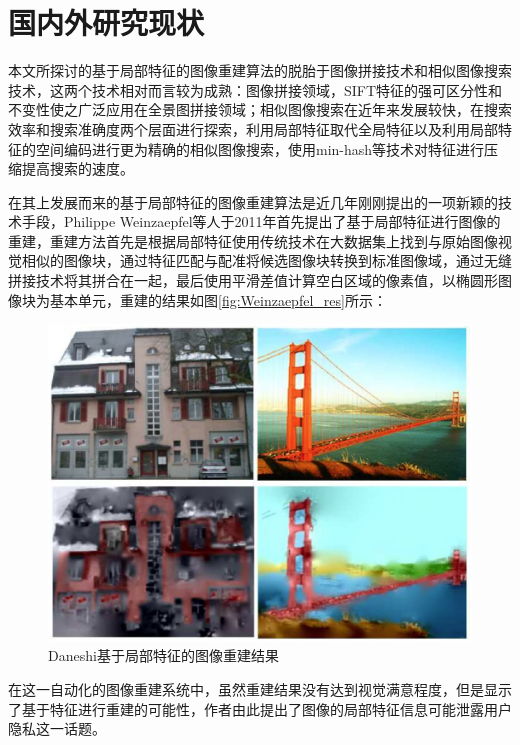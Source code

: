 \section{国内外研究现状}

本文所探讨的基于局部特征的图像重建算法的脱胎于图像拼接技术和相似图像搜索技术，这两个技术相对而言较为成熟：图像拼接领域，SIFT特征的强可区分性和不变性使之广泛应用在全景图拼接领域\cite{Brown:2006ir}；相似图像搜索在近年来发展较快，在搜索效率和搜索准确度两个层面进行探索，利用局部特征取代全局特征\cite{Xu:2013wc,POLICY:2013te,Wu:2009bl}以及利用局部特征的空间编码\cite{Zhou:2010tv}进行更为精确的相似图像搜索，使用min-hash等技术对特征进行压缩\cite{Chum:2008jo}提高搜索的速度。

在其上发展而来的基于局部特征的图像重建算法是近几年刚刚提出的一项新颖的技术手段，Philippe Weinzaepfel等人于2011年首先提出了基于局部特征进行图像的重建\cite{Weinzaepfel:2011jh}，重建方法首先是根据局部特征使用传统技术在大数据集上找到与原始图像视觉相似的图像块，通过特征匹配与配准将候选图像块转换到标准图像域，通过无缝拼接技术将其拼合在一起，最后使用平滑差值计算空白区域的像素值，以椭圆形图像块为基本单元，重建的结果如图\ref{fig:Weinzaepfel_res}所示：

\begin{figure}
\centering\includegraphics[width=15cm]{imgs/ch1/Daneshi_res}
\caption{Daneshi基于局部特征的图像重建结果}
\label{fig:Daneshi_res}
\end{figure}

在这一自动化的图像重建系统中，虽然重建结果没有达到视觉满意程度，但是显示了基于特征进行重建的可能性，作者由此提出了图像的局部特征信息可能泄露用户隐私这一话题。

